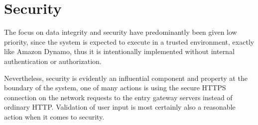 \section{Security} \label{sec:security}
The focus on data integrity and security have predominantly been given low priority, since the system is expected to execute in a trusted environment, exactly like Amazon Dynamo, thus it is intentionally implemented without internal authentication or authorization.
\newline

Nevertheless, security is evidently an influential component and property at the boundary of the system, one of many actions is \eg using the secure HTTPS connection on the network requests to the entry gateway servers instead of ordinary HTTP. Validation of user input is most certainly also a reasonable action when it comes to security.
